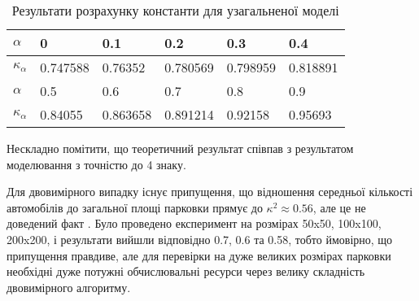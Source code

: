 \begin{table}[ht]
	\caption{Результати розрахунку константи для узагальненої моделі}
	\centering
\begin{tabular}{|p{}|p{}|p{}|p{}|p{}|p{}|}
	\hline
	$\alpha$ & 0 & 0.1 & 0.2 & 0.3 & 0.4 \\
	\hline
	$\kappa_\alpha$ & 0.747588 &0.76352 &0.780569 &0.798959 &0.818891  \\
	\hline
	\hline
	$\alpha$  & 0.5 & 0.6 & 0.7 & 0.8 & 0.9\\
	\hline
	$\kappa_\alpha$  &0.84055 &0.863658 &0.891214 &0.92158 &0.95693 \\
	\hline
\end{tabular}	
	\label{tab:uniform_right_model_result}
\end{table}

Нескладно помітити, що теоретичний результат співпав з результатом моделювання з точністю до 4 знаку.

Для двовимірного випадку існує припущення, що відношення середньої кількості автомобілів до загальної площі парковки прямує до $\kappa^2 \approx 0.56$, але це не доведений факт \cite{MathWorldRenyi}. Було проведено експеримент на розмірах 50x50, 100x100, 200x200, і результати вийшли відповідно 0.7, 0.6 та 0.58, тобто ймовірно, що припущення правдиве, але для перевірки на дуже великих розмірах парковки необхідні дуже потужні обчислювальні ресурси через велику складність двовимірного алгоритму.